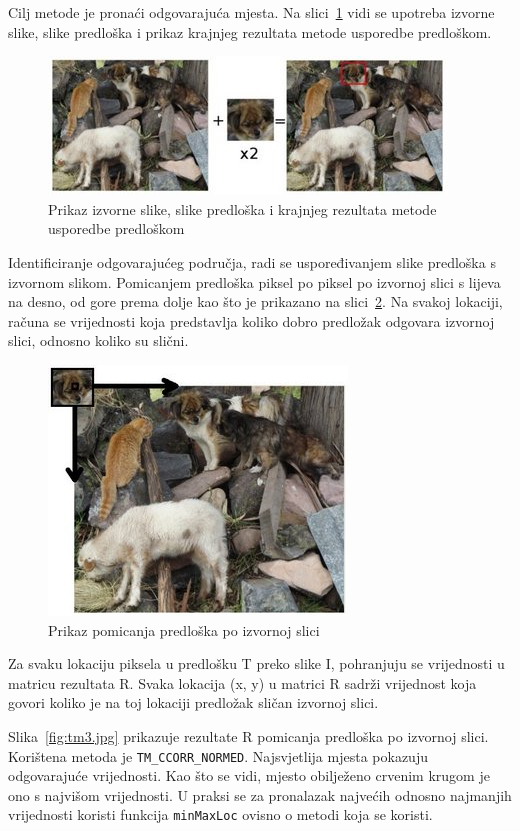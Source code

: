 Cilj metode je pronaći odgovarajuća mjesta. Na
slici~\ref{fig:tm1.jpg} vidi se upotreba izvorne slike, slike predloška
i prikaz krajnjeg rezultata metode usporedbe predloškom.

\begin{figure}[h]
\centering
\includegraphics[scale=1]{figures/tm1.jpg}
\caption{Prikaz izvorne slike, slike predloška i krajnjeg rezultata
metode usporedbe predloškom}
\label{fig:tm1.jpg}
\end{figure}

Identificiranje odgovarajućeg područja, radi se uspoređivanjem slike
predloška s izvornom slikom. Pomicanjem predloška piksel po piksel po
izvornoj slici s lijeva na desno, od gore prema dolje kao što je
prikazano na slici~\ref{fig:tm2.jpg}. Na svakoj lokaciji, računa se
vrijednosti koja predstavlja koliko dobro predložak odgovara izvornoj
slici, odnosno koliko su slični.

\begin{figure}[h]
\centering
\includegraphics[scale=0.5]{figures/tm2.jpg}
\caption{Prikaz pomicanja predloška po izvornoj slici}
\label{fig:tm2.jpg}
\end{figure}

Za svaku lokaciju piksela u predlošku T preko slike I, pohranjuju se
vrijednosti u matricu rezultata R. Svaka lokacija (x, y) u matrici R
sadrži vrijednost koja govori koliko je na toj lokaciji predložak
sličan izvornoj slici. 

Slika~\ref{fig:tm3.jpg} prikazuje rezultate R pomicanja predloška po
izvornoj slici. Korištena metoda je \texttt{TM\_CCORR\_NORMED}.
Najsvjetlija mjesta pokazuju odgovarajuće vrijednosti. Kao što se vidi,
mjesto obilježeno crvenim krugom je ono s najvišom vrijednosti. U praksi
se za pronalazak najvećih odnosno najmanjih vrijednosti koristi funkcija
\texttt{minMaxLoc} ovisno o metodi koja se koristi.


